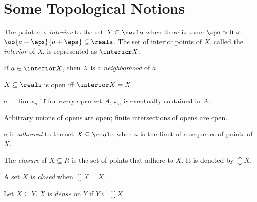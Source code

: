 \setcounter{chapter}{5}
\chapter{Some Topological Notions}

\begin{definition}
	The point $a$ is \emph{interior} to the set $X \subseteq \reals$ when there is some $\eps > 0$ st $\oo{a - \eps}{a + \eps}\subseteq \reals$. The set of interior points of $X$, called the \emph{interior} of $X$, is represented as $\interior X$.
\end{definition}

\begin{definition}[Neighborhood]
	If $a \in \interior X$, then $X$ is a \emph{neighborhood} of $a$.
\end{definition}

\begin{definition}
	$X\subseteq \reals$ is open iff $\interior X = X$.
\end{definition}


\begin{fact}
	$a = \lim x_n$ iff for every open set $A$, $x_n$ is eventually contained in $A$. 
\end{fact}

\begin{theorem}
	Arbitrary unions of opens are open; finite intersections of opens are open.
\end{theorem}

\begin{definition}
	$a$ is \emph{adherent} to the set $X \subseteq \reals$ when $a$ is the limit of a sequence of points of $X$.
\end{definition}

\begin{definition}[Closure]
	The \emph{closure} of $X \subseteq R$ is the set of points that adhere to $X$. It is denoted by $\closure X$.
\end{definition}

\begin{definition}
	A set $X$ is \emph{closed} when $\closure X= X$.
\end{definition}

\begin{definition}
	Let $X \subseteq Y$. $X$ is \emph{dense} on $Y$ if $Y \subseteq \closure X$.
\end{definition}

